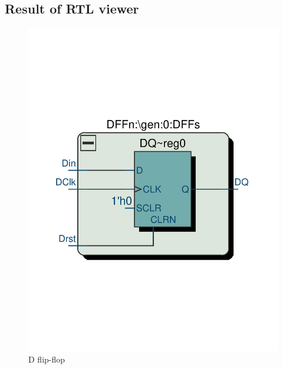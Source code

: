 \documentclass[13pt,a4paper]{report}
\begin{document}
\subsection{Result of RTL viewer}
\begin{figure}[H]
\centering
\includegraphics[scale=0.4, clip, trim={2cm 8cm 2cm 9.1cm}]{images/Exc1_DFF_RTL.pdf}
\caption*{D flip-flop}
\end{figure}
\end{document}
